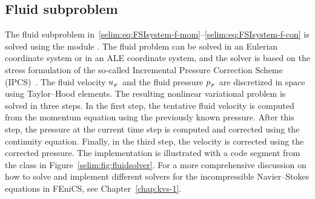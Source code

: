 \vspace*{-3pt}\subsection{Fluid subproblem}

The fluid subproblem in~\eqref{selim:eq:FSIsystem-f-mom}--\eqref{selim:eq:FSIsystem-f-con} is solved using the
 module . The fluid problem can be
solved in an Eulerian coordinate system or in an ALE coordinate
system, and the solver is based on the stress formulation of the
so-called Incremental Pressure Correction Scheme
(IPCS)~\citep{Goda1979}. The fluid velocity $u_{_{F}}$ and the fluid
pressure $p_{_{F}}$ are discretized in space using Taylor--Hood
elements. The resulting nonlinear variational problem is solved in
three steps. In the first step, the tentative fluid velocity is
computed from the momentum equation using the previously known
pressure. After this step, the pressure at the current time step is
computed and corrected using the continuity equation. Finally, in the
third step, the velocity is corrected using the corrected pressure.
The implementation is illustrated with a code segment from the class
 in Figure~\ref{selim:fig:fluidsolver}. For a
more comprehensive discussion on how to solve and implement different
solvers for the incompressible Navier--Stokes equations in FEniCS, see
Chapter~\ref{chap:kvs-1}.
